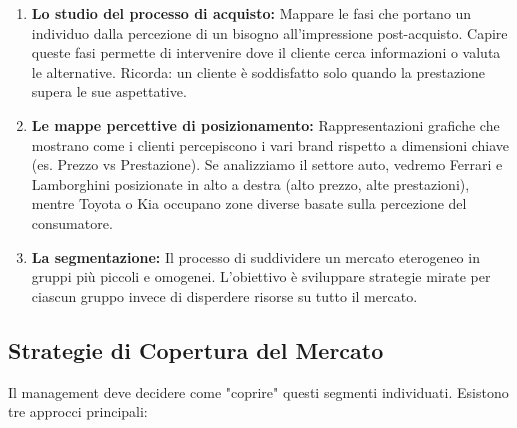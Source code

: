 \documentclass[a4paper,10pt]{article}
\begin{document}
\begin{enumerate}
    \item \textbf{Lo studio del processo di acquisto:} Mappare le fasi che portano un individuo dalla percezione di un bisogno all'impressione post-acquisto. Capire queste fasi permette di intervenire dove il cliente cerca informazioni o valuta le alternative. Ricorda: un cliente è soddisfatto solo quando la prestazione supera le sue aspettative.
    \item \textbf{Le mappe percettive di posizionamento:} Rappresentazioni grafiche che mostrano come i clienti percepiscono i vari brand rispetto a dimensioni chiave (es. Prezzo vs Prestazione). Se analizziamo il settore auto, vedremo Ferrari e Lamborghini posizionate in alto a destra (alto prezzo, alte prestazioni), mentre Toyota o Kia occupano zone diverse basate sulla percezione del consumatore.
    \item \textbf{La segmentazione:} Il processo di suddividere un mercato eterogeneo in gruppi più piccoli e omogenei. L'obiettivo è sviluppare strategie mirate per ciascun gruppo invece di disperdere risorse su tutto il mercato.
\end{enumerate}

\subsection*{Strategie di Copertura del Mercato}

Il management deve decidere come "coprire" questi segmenti individuati. Esistono tre approcci principali:

\begin{table}[H]
\setlength{\extrarowheight}{10pt}
\caption{Approcci alla copertura del mercato}
\end{table}
\end{document}
